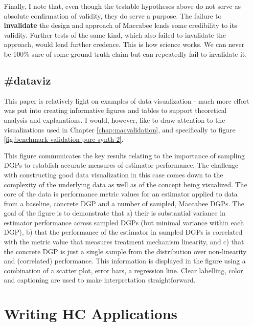 \documentclass[./main.tex]{subfiles}
\begin{document}
Finally, I note that, even though the testable hypotheses above do not serve as absolute confirmation of validity, they do serve a purpose. The failure to \textbf{invalidate} the design and approach of Maccabee lends some credibility to its validity. Further tests of the same kind, which also failed to invalidate the approach, would lend further credence. This is how science works. We can never be 100\% sure of some ground-truth claim but can repeatedly fail to invalidate it.


\subsection*{\textbf{\#dataviz}}
\label{hc:dataviz}

This paper is relatively light on examples of data visualization - much more effort was put into creating informative figures and tables to support theoretical analysis and explanations. I would, however, like to draw attention to the visualizations used in Chapter \ref{chap:macvalidation}, and specifically to figure \ref{fig:benchmark-validation-pure-synth-2}. 

\vspace{\baselineskip}

This figure communicates the key results relating to the importance of sampling DGPs to establish accurate measures of estimator performance. The challenge with constructing good data visualization in this case comes down to the complexity of the underlying data as well as of the concept being visualized. The core of the data is performance metric values for an estimator applied to data from a baseline, concrete DGP and a number of sampled, Maccabee DGPs. The goal of the figure is to demonstrate that a) their is substantial variance in estimator performance across sampled DGPs (but minimal variance within each DGP), b) that the performance of the estimator in sampled DGPs is correlated with the metric value that measures treatment mechanism linearity, and c) that the concrete DGP is just a single sample from the distribution over non-linearity and (correlated) performance. This information is displayed in the figure using a combination of a scatter plot, error bars, a regression line. Clear labelling, color and captioning are used to make interpretation straightforward.


\section{Writing HC Applications}
\label{hc:section-writing}
\end{document}
